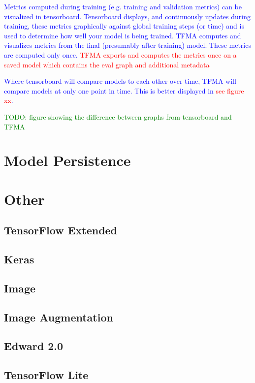 \textcolor{blue}{Metrics computed during training (e.g. training and validation metrics) can be visualized in tensorboard. Tensorboard displays, and continuously updates during training, these metrics graphically against global training steps (or time) and is used to determine how well your model is being trained. TFMA computes and visualizes metrics from the final (presumably after training) model. These metrics are computed only once. \textcolor{red}{TFMA exports and computes the metrics once on a saved model which contains the eval graph and additional metadata}}

\textcolor{blue}{Where tensorboard will compare models to each other over time, TFMA will compare models at only one point in time. This is better displayed in \textcolor{red}{see figure xx}.}

\textcolor{green}{TODO: figure showing the difference between graphs from tensorboard and TFMA}








\section{Model Persistence}









\section{Other}



\subsection{TensorFlow Extended}

\subsection{Keras}

\subsection{Image}

\subsection{Image Augmentation}

\subsection{Edward 2.0}

\subsection{TensorFlow Lite}
